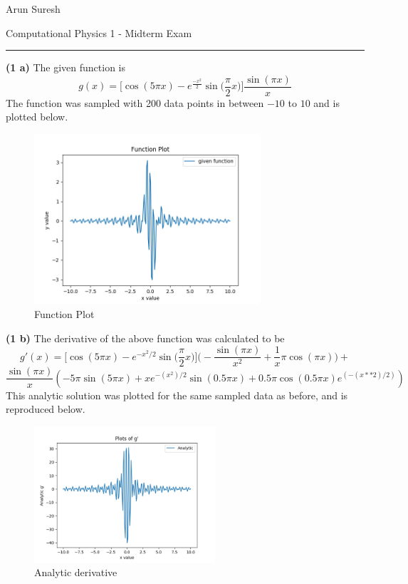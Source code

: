 \documentclass[12pt]{article}
\begin{document}
	Arun Suresh
	\begin{center}
		Computational Physics 1 - Midterm Exam
	\end{center} 
	{\rule{\linewidth}{0.1mm} }

\textbf{(1 a)} The given function is $$g(x) = \bigg [\cos(5\pi x) - e^{\frac{-x^2}{2}}\sin \bigg (\frac{\pi}{2}x \bigg ) \bigg ]\frac{\sin(\pi x)}{x}$$ The function was sampled with 200 data points in between $-10$ to $10$ and is plotted below.
\begin{figure}[h]
	\centering
	\includegraphics[width=0.75\textwidth]{functionplot200.png}
	\caption{Function Plot}
\end{figure}

\textbf{(1 b)} The derivative of the above function was calculated to be 
$$g'(x) = \bigg [\cos(5\pi x) - e^{-x^2/2}\sin\bigg (\frac{\pi}{2} x\bigg )\bigg ]\bigg (-\frac{\sin(\pi x)}{x^2} + \frac{1}{x}\pi\cos(\pi x)\bigg ) +$$ $$ \frac{\sin(\pi x)}{x}(-5\pi\sin(5\pi x) + xe^{-(x^2)/2}\sin(0.5\pi x) + 0.5\pi\cos(0.5\pi x)e^{(-(x**2)/2)})$$
This analytic solution was plotted for the same sampled data as before, and is reproduced below. 
\begin{figure}[h]
	\centering
	\includegraphics[width=0.60\textwidth]{gpranalytic.png}
	\caption{Analytic derivative}
\end{figure}\\\\\\
\end{document}
